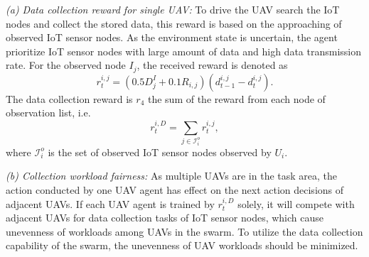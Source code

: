 \documentclass[journal]{IEEEtran}
\begin{document}
\textit{(a) Data collection reward for single UAV:} To drive the UAV search the IoT nodes and collect the stored data, this reward is based on the approaching of observed IoT sensor nodes. As the environment state is uncertain, the agent prioritize IoT sensor nodes with large amount of data and high data transmission rate. For the observed node $I_j$, the received reward is denoted as 
\begin{equation}\label{reward_dc_i}
r^{i,j}_{t}=\left({0.5 D^I_j + 0.1 R_{i,j}}\right)\left({d_{t-1}^{i,j}-d_{t}^{i,j}}\right).
\end{equation}
The data collection reward is $r_4$ the sum of the reward from each node of observation list, i.e. 
\begin{equation}\label{reward_dc}
r^{i,D}_{t}=\sum_{j\in \mathcal{I}^{o}_{i}}r^{i,j}_{t},
\end{equation} 
where $\mathcal{I}^{o}_{i}$ is the set of observed IoT sensor nodes observed by $U_i$.

\textit{(b) Collection workload fairness:} As multiple UAVs are in the task area, the action conducted by one UAV agent has effect on the next action decisions of adjacent UAVs. If each UAV agent is trained by $r^{i,D}_{t}$ solely, it will compete with adjacent UAVs for data collection tasks of IoT sensor nodes, which cause unevenness of workloads among UAVs in the swarm. To utilize the data collection capability of the swarm, the unevenness of UAV workloads should be minimized. 
\end{document}
